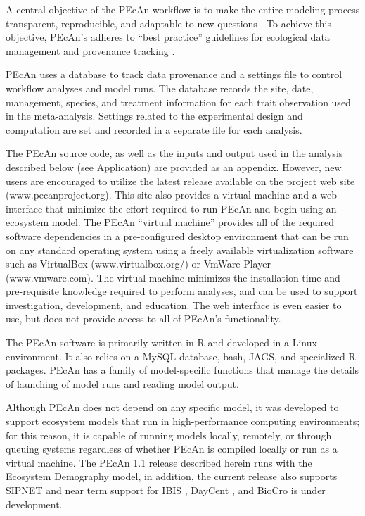 \documentclass[12pt]{article}
\begin{document}
\begin{flushleft}
\begin{spacing}{1.9}
 A central objective of the PEcAn workflow is to make the entire modeling process transparent, reproducible, and adaptable to new questions  \citep[\textit{sensu} ][]{stodden2010rr,ellison2010rte}.
 To achieve this objective, PEcAn's adheres to ``best practice'' guidelines for ecological data management and provenance tracking \citep{jones2006nbi,michener2012ese}. 

 PEcAn uses a database to track data provenance and a settings file to control workflow analyses and model runs.
 The database records the site, date, management, species, and treatment information for each trait observation used in the meta-analysis.
 Settings related to the experimental design and computation are set and recorded in a separate file for each analysis.
   
 The PEcAn source code, as well as the inputs and output used in the analysis described below (see Application) are provided as an appendix.
 However, new users are encouraged to utilize the latest release available on the project web site (www.pecanproject.org).
 This site also provides a virtual machine and a web-interface that minimize the effort required to run PEcAn and begin using an ecosystem model.
 The PEcAn ``virtual machine'' provides all of the required software dependencies in a pre-configured desktop environment that can be run on any standard operating system using a freely available virtualization software such as VirtualBox (www.virtualbox.org/) or VmWare Player (www.vmware.com).
 The virtual machine minimizes the installation time and pre-requisite knowledge required to perform analyses, and can be used to support investigation, development, and education.
 The web interface is even easier to use, but does not provide access to all of PEcAn's functionality. 

 The PEcAn software is primarily written in R and developed in a Linux environment.
 It also relies on a MySQL database, bash, JAGS, and specialized R packages.
 PEcAn has a family of model-specific functions that manage the details of launching of model runs and reading model output.
 
 Although PEcAn does not depend on any specific model, it was developed to support ecosystem models that run in high-performance computing environments; for this reason, it is capable of running models locally, remotely, or through queuing systems regardless of whether PEcAn is compiled locally or run as a virtual machine.
 The PEcAn 1.1 release described herein runs with the Ecosystem Demography model, in addition, the current release also supports SIPNET \citep[][]{moore2008ets} and near term support for IBIS \citep{kucharik2000tpd}, DayCent \citep{parton1998dls}, and BioCro \citep{miguez2009smp} is under development.


\end{spacing}
\end{flushleft}
\end{document}
